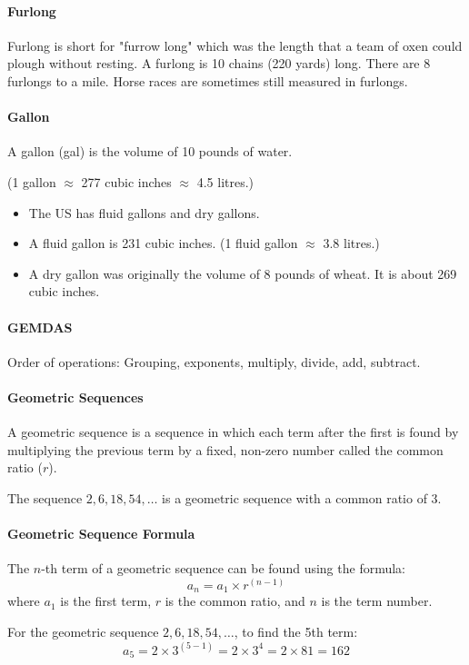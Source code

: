 \documentclass[12pt]{article}
\begin{document}
\paragraph{Furlong}
Furlong is short for "furrow long" which was the length that a team of oxen could plough without resting. A furlong is 10 chains (220 yards) long. There are 8 furlongs to a mile. Horse races are sometimes still measured in furlongs.

\paragraph{Gallon}
A gallon (gal) is the volume of 10 pounds of water.

(1 gallon $\approx$ 277 cubic inches $\approx$ 4.5 litres.)
  \begin{itemize}
  \item The US has fluid gallons and dry gallons.
  \item A fluid gallon is 231 cubic inches. (1 fluid gallon $\approx$ 3.8 litres.)
  \item A dry gallon was originally the volume of 8 pounds of wheat. It is about 269 cubic inches.
  \end{itemize}

\paragraph{GEMDAS}
Order of operations: Grouping, exponents, multiply, divide, add, subtract.

\paragraph{Geometric Sequences}
A geometric sequence is a sequence in which each term after the first is found by multiplying the previous term by a fixed, non-zero number called the common ratio (\(r\)).

The sequence \(2, 6, 18, 54, \ldots\) is a geometric sequence with a common ratio of 3.

\paragraph{Geometric Sequence Formula}
The \(n\)-th term of a geometric sequence can be found using the formula:
\[
a_n = a_1 \times r^{(n-1)}
\]
where \(a_1\) is the first term, \(r\) is the common ratio, and \(n\) is the term number.

For the geometric sequence \(2, 6, 18, 54, \ldots\), to find the 5th term:
\[
a_5 = 2 \times 3^{(5-1)} = 2 \times 3^4 = 2 \times 81 = 162
\]
\end{document}
